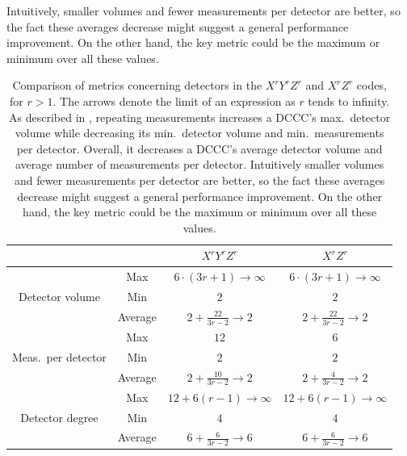 Intuitively, smaller volumes and fewer measurements per detector are better,
so the fact these averages decrease might suggest a general performance improvement.
On the other hand, the key metric could be the maximum or minimum over all these values.

\begingroup
\renewcommand*{\arraystretch}{1.5}
\begin{table}[htbp]
    \centering
    \begin{tabular}{|c|c|c|c|}
        \hline
        & & $X^r Y^r Z^r$ & $X^r Z^r$ \\
        \hline
        \multirow{3}{*}{Detector volume} & Max & $6 \cdot (3r + 1) \to \infty$ & $6 \cdot (3r + 1) \to \infty$ \\
        \cline{2-4}
        & Min & $2$ & $2$ \\
        \cline{2-4}
        & Average & $2 + \frac{22}{3r - 2} \to 2$ & $2 + \frac{22}{3r - 2} \to 2$ \\
        \hline
        \multirow{3}{*}{Meas.\ per detector} & Max & $12$ & $6$ \\
        \cline{2-4}
        & Min & $2$ & $2$ \\
        \cline{2-4}
        & Average & $2 + \frac{10}{3r - 2} \to 2$ & $2 + \frac{4}{3r - 2} \to 2$ \\
        \hline
        \multirow{3}{*}{Detector degree} & Max & $12 + 6(r-1) \to \infty$ & $12 + 6(r-1) \to \infty$ \\
        \cline{2-4}
        & Min & $4$ & $4$ \\
        \cline{2-4}
        & Average & $6 + \frac{6}{3r - 2} \to 6$ & $6 + \frac{6}{3r - 2} \to 6$ \\
        \hline
    \end{tabular}
    \caption{
        Comparison of metrics concerning detectors in the $X^r Y^r Z^r$ and $X^r Z^r$ codes, for $r > 1$.
        The arrows denote the limit of an expression as $r$ tends to infinity.
        As described in , repeating measurements increases a DCCC's max.\ detector volume while decreasing its min.\ detector volume and min.\ measurements per detector.
        Overall, it decreases a DCCC's average detector volume and average number of measurements per detector.
        Intuitively smaller volumes and fewer measurements per detector are better,
        so the fact these averages decrease might suggest a general performance improvement.
        On the other hand, the key metric could be the maximum or minimum over all these values.
    }
    \label{tab:repeated_xyz_css_averages}
\end{table}
\endgroup


